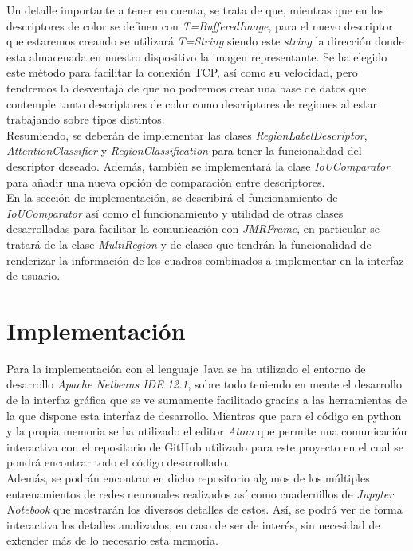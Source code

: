 Un detalle importante a tener en cuenta, se trata de que, mientras que en los descriptores de color se definen con \emph{T=BufferedImage}, para el nuevo descriptor que estaremos creando se utilizará \emph{T=String} siendo este \emph{string} la dirección donde esta almacenada en nuestro dispositivo la imagen representante. Se ha elegido este método para facilitar la conexión TCP, así como su velocidad, pero tendremos la desventaja de que no podremos crear una base de datos que contemple tanto descriptores de color como descriptores de regiones al estar trabajando sobre tipos distintos.\\

Resumiendo, se deberán de implementar las clases \emph{RegionLabelDescriptor}, \emph{AttentionClassifier} y \emph{RegionClassification} para tener la funcionalidad del descriptor deseado. Además, también se implementará la clase \emph{IoUComparator} para añadir una nueva opción de comparación entre descriptores.\\

En la sección de implementación, se describirá el funcionamiento de \emph{IoUComparator} así como el funcionamiento y utilidad de otras clases desarrolladas para facilitar la comunicación con \emph{JMRFrame}, en particular se tratará de la clase \emph{MultiRegion} y de clases que tendrán la funcionalidad de renderizar la información de los cuadros combinados a implementar en la interfaz de usuario.

\chapter{Implementación}
Para la implementación con el lenguaje Java se ha utilizado el entorno de desarrollo \emph{Apache Netbeans IDE 12.1}, sobre todo teniendo en mente el desarrollo de la interfaz gráfica que se ve sumamente facilitado gracias a las herramientas de la que dispone esta interfaz de desarrollo. Mientras que para el código en python y la propia memoria se ha utilizado el editor \emph{Atom} que permite una comunicación interactiva con el repositorio de GitHub utilizado para este proyecto \cite{GitHub} en el cual se pondrá encontrar todo el código desarrollado.\\

Además, se podrán encontrar en dicho repositorio algunos de los múltiples entrenamientos de redes neuronales realizados así como cuadernillos de \emph{Jupyter Notebook} que mostrarán los diversos detalles de estos. Así, se podrá ver de forma interactiva los detalles analizados, en caso de ser de interés, sin necesidad de extender más de lo necesario esta memoria.
